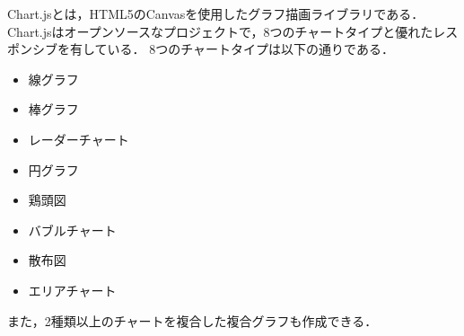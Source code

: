 Chart.js\cite{chartjs}とは，HTML5のCanvasを使用したグラフ描画ライブラリである．
Chart.jsはオープンソースなプロジェクトで，8つのチャートタイプと優れたレスポンシブを有している．
8つのチャートタイプは以下の通りである．
\begin{itemize}
    \item 線グラフ
    \item 棒グラフ
    \item レーダーチャート
    \item 円グラフ
    \item 鶏頭図
    \item バブルチャート
    \item 散布図
    \item エリアチャート
\end{itemize}
また，2種類以上のチャートを複合した複合グラフも作成できる．
